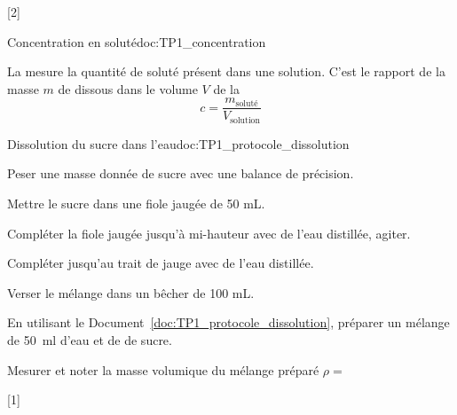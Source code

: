 [2]


\begin{doc}{Concentration en soluté}{doc:TP1_concentration}
  \begin{importants}
    La  mesure la quantité de soluté présent dans une solution.
    C'est le rapport de la masse $m$ de  dissous dans le volume $V$ de la 
    \begin{equation*}
      c = \frac{m_\text{soluté}}{V_\text{solution}}
    \end{equation*} 
  \end{importants}
\end{doc}


\begin{doc}{Dissolution du sucre dans l'eau}{doc:TP1_protocole_dissolution}
  \begin{protocole}
      \item Peser une masse donnée de sucre avec une balance de précision.
      \item Mettre le sucre dans une fiole jaugée de 50 mL.
      \item Compléter la fiole jaugée jusqu'à mi-hauteur avec de l'eau distillée, agiter.
      \item Compléter jusqu'au trait de jauge avec de l'eau distillée.
      \item Verser le mélange dans un bêcher de 100 mL.
  \end{protocole}
\end{doc}


\newpage
\vspace*{-28pt}

\mesure
En utilisant le Document~\ref{doc:TP1_protocole_dissolution}, préparer un mélange de \qty{50}{\ml} d'eau et de de sucre.

\mesure
Mesurer et noter la masse volumique du mélange préparé $\rho =$ 

[1]


